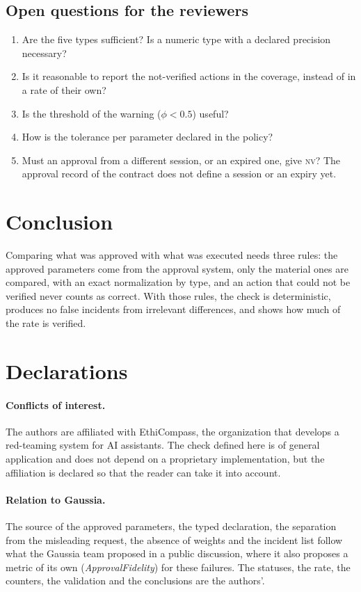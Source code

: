 \documentclass[11pt,a4paper]{article}
\begin{document}
\subsection{Open questions for the reviewers}

\begin{enumerate}
  \item Are the five types sufficient? Is a numeric type with a declared precision necessary?
  \item Is it reasonable to report the not-verified actions in the coverage, instead of in a rate of their
    own?
  \item Is the threshold of the warning ($\phi < 0.5$) useful?
  \item How is the tolerance per parameter declared in the policy?
  \item Must an approval from a different session, or an expired one, give \textsc{nv}? The approval record of
    the contract does not define a session or an expiry yet.
\end{enumerate}

\section{Conclusion}

Comparing what was approved with what was executed needs three rules: the approved parameters come from the
approval system, only the material ones are compared, with an exact normalization by type, and an action that
could not be verified never counts as correct. With those rules, the check is deterministic, produces no false
incidents from irrelevant differences, and shows how much of the rate is verified.

\section*{Declarations}

\paragraph{Conflicts of interest.} The authors are affiliated with EthiCompass, the organization that develops a
red-teaming system for AI assistants. The check defined
here is of general application and does not depend on a proprietary implementation, but the affiliation is
declared so that the reader can take it into account.

\paragraph{Relation to Gaussia.} The source of the approved parameters, the typed declaration, the separation
from the misleading request, the absence of weights and the incident list follow what the Gaussia team proposed
in a public discussion, where it also proposes a metric of its own (\emph{ApprovalFidelity}) for these failures.
The statuses, the rate, the counters, the validation and the conclusions are the
authors'.
\end{document}
